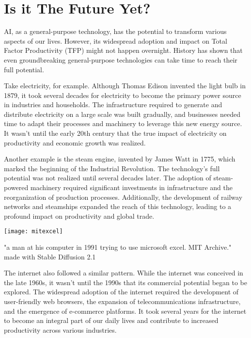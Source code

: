 \section{Is it The Future Yet?}

AI, as a general-purpose technology, has the potential to transform various aspects of our lives. However, its widespread adoption and impact on Total Factor Productivity (TFP) might not happen overnight. History has shown that even groundbreaking general-purpose technologies can take time to reach their full potential.

Take electricity, for example. Although Thomas Edison invented the light bulb in 1879, it took several decades for electricity to become the primary power source in industries and households. The infrastructure required to generate and distribute electricity on a large scale was built gradually, and businesses needed time to adapt their processes and machinery to leverage this new energy source. It wasn't until the early 20th century that the true impact of electricity on productivity and economic growth was realized.

Another example is the steam engine, invented by James Watt in 1775, which marked the beginning of the Industrial Revolution. The technology's full potential was not realized until several decades later. The adoption of steam-powered machinery required significant investments in infrastructure and the reorganization of production processes. Additionally, the development of railway networks and steamships expanded the reach of this technology, leading to a profound impact on productivity and global trade.

\begin{marginfigure}[-5.5cm]
    \texttt{[image: mitexcel]}
        \caption{"a man at his computer in 1991 trying to use microsoft excel. MIT Archive." made with Stable Diffusion 2.1}
\end{marginfigure}

The internet also followed a similar pattern. While the internet was conceived in the late 1960s, it wasn't until the 1990s that its commercial potential began to be explored. The widespread adoption of the internet required the development of user-friendly web browsers, the expansion of telecommunications infrastructure, and the emergence of e-commerce platforms. It took several years for the internet to become an integral part of our daily lives and contribute to increased productivity across various industries.


